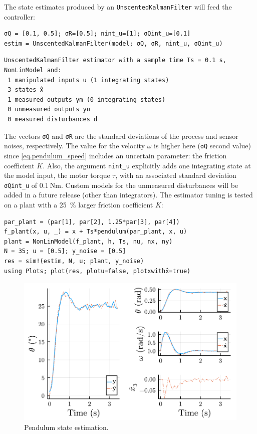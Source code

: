 The state estimates produced by an \texttt{UnscentedKalmanFilter} will feed the controller:
\begin{verbatim}
σQ = [0.1, 0.5]; σR=[0.5]; nint_u=[1]; σQint_u=[0.1]
estim = UnscentedKalmanFilter(model; σQ, σR, nint_u, σQint_u)
\end{verbatim}
\spacerepl
\begin{verbatim}
UnscentedKalmanFilter estimator with a sample time Ts = 0.1 s, 
NonLinModel and:
 1 manipulated inputs u (1 integrating states)
 3 states x̂
 1 measured outputs ym (0 integrating states)
 0 unmeasured outputs yu
 0 measured disturbances d
\end{verbatim}
The vectors \texttt{σQ} and \texttt{σR} are the standard deviations of the process and sensor noises, respectively. The value for the velocity $\omega$ is higher here (\texttt{σQ} second value) since \eqref{eq.pendulum_speed} includes an uncertain parameter: the friction coefficient $K$. Also, the argument \texttt{nint\_u} explicitly adds one integrating state at the model input, the motor torque $\tau$, with an associated standard deviation \texttt{σQint\_u} of $\SI{0.1}{\newton\meter}$. Custom models for the unmeasured disturbances will be added in a future release (other than integrators). The estimator tuning is tested on a plant with a \SI{25}{\percent} larger friction coefficient $K$:
\begin{verbatim}
par_plant = (par[1], par[2], 1.25*par[3], par[4])
f_plant(x, u, _) = x + Ts*pendulum(par_plant, x, u)
plant = NonLinModel(f_plant, h, Ts, nu, nx, ny)
N = 35; u = [0.5]; y_noise = [0.5]
res = sim!(estim, N, u; plant, y_noise)
using Plots; plot(res, plotu=false, plotxwithx̂=true)
\end{verbatim}

\begin{figure}[h]
    \centering
    \includegraphics[width=\columnwidth]{fig/plot_NonLinMPC1.pdf}
    \caption{Pendulum state estimation.}
    \label{fig:plot_NonLinMPC1}
\end{figure}

